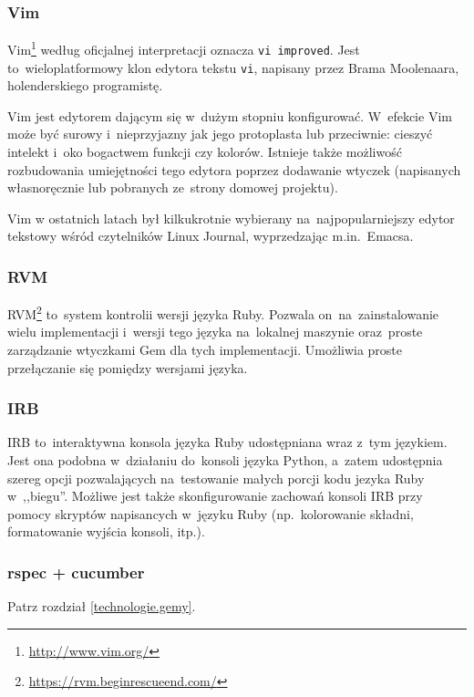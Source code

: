 \subsubsection{Vim}

Vim\footnote{\url{http://www.vim.org/}} według oficjalnej interpretacji oznacza \texttt{vi improved}. Jest to~wieloplatformowy klon edytora tekstu \texttt{vi}, napisany przez Brama Moolenaara, holenderskiego programistę.


Vim jest edytorem dającym się w~dużym stopniu konfigurować. W~efekcie Vim może być surowy i~nieprzyjazny jak jego protoplasta lub przeciwnie: cieszyć intelekt i~oko bogactwem funkcji czy kolorów. Istnieje także możliwość rozbudowania umiejętności tego edytora poprzez dodawanie wtyczek (napisanych własnoręcznie lub pobranych ze~strony domowej projektu).


Vim w ostatnich latach był kilkukrotnie wybierany na~najpopularniejszy edytor tekstowy wśród czytelników Linux Journal, wyprzedzając m.in.~Emacsa.

\subsubsection{RVM}

RVM\footnote{\url{https://rvm.beginrescueend.com/}} to~system kontrolii wersji języka Ruby. Pozwala on~na~zainstalowanie wielu implementacji i~wersji tego języka na~lokalnej maszynie oraz~proste zarządzanie wtyczkami Gem dla tych implementacji. Umożliwia proste przełączanie się pomiędzy wersjami języka.

\subsubsection{IRB}

IRB to~interaktywna konsola języka Ruby udostępniana wraz z~tym językiem. Jest ona podobna w~działaniu do~konsoli języka Python, a~zatem udostępnia szereg opcji pozwalających na~testowanie małych porcji kodu jezyka Ruby w~,,biegu''. Możliwe jest także skonfigurowanie zachowań konsoli IRB przy pomocy skryptów napisancych w~języku Ruby (np.~kolorowanie składni, formatowanie wyjścia konsoli, itp.).

\subsubsection{rspec + cucumber}

Patrz rozdział \ref{technologie.gemy}.

